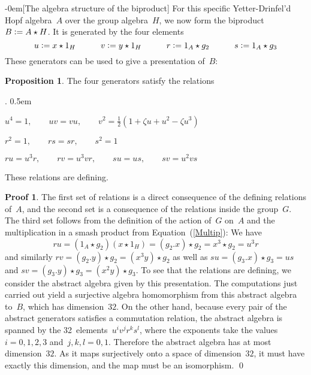 \documentclass{article}
\makeatletter
\renewcommand{\subsection}{\@startsection{subsection}{2}{0em}%
{\baselineskip}{-0em}{\bfseries\normalsize}}
\newcounter{num}
\newcounter{num1}
\newenvironment{proplist}{\begin{list}{\arabic{num1}.}{\usecounter{num1} \listparindent0pt \topsep-2pt  \leftmargin25pt \itemindent0pt \itemsep5pt \partopsep0pt \labelwidth10pt \labelsep0.5em }}{\end{list}}
\numberwithin{equation}{section}
\theoremstyle{definition}
\newtheorem*{prop}{Proposition}
\newtheorem*{pf}{Proof}
\theoremstyle{break}
\newcommand{\deq}{\vcentcolon =}
\newcommand{\1}{{(1)}}
\newcommand{\2}{{(2)}}
\newcommand{\3}{{(3)}}
\newcommand{\A}{1_A}
\newcommand{\HH}{1_H}
\makeatother
\begin{document}
\subsection[The algebra structure of the biproduct]{} \label{AlgBiprod}
\enlargethispage{8pt}
For this specific Yetter-Drinfel'd Hopf algebra~$A$ over the group algebra~$H$, we now form the biproduct~$B \deq A \star H$. It is generated by the four elements
\[u \deq x \star \HH \qquad \quad v \deq y \star \HH \qquad \quad
r \deq \A \star g_2 \qquad \quad s \deq \A \star g_3\]
These generators can be used to give a presentation of~$B$:
\begin{prop}
The four generators satisfy the relations
\begin{proplist}
\item
$\displaystyle
u^4 = 1, \qquad uv = vu, \qquad v^2 = \frac{1}{2}(1 + \zeta u + u^2 - \zeta u^3)$

\item
$\displaystyle
r^2 = 1, \qquad rs = sr, \qquad s^2 = 1$

\item
$\displaystyle
r u = u^3 r, \qquad r v = u^3 v r, \qquad s u = u s, \qquad s v = u^2 v s$
\end{proplist}
These relations are defining.
\end{prop}
\begin{pf}
The first set of relations is a direct consequence of the defining relations of~$A$, and the second set is a consequence of the relations inside the group~$G$. The third set follows from the definition of the action of~$G$ on~$A$ and the multiplication in a smash product from Equation~(\ref{Multip}): We have
\[ru = (\A \star g_2) (x \star \HH) = (g_2.x) \star g_2 = x^3 \star g_2 = u^3 r \]
and similarly $r v = (g_2.y) \star g_2 = (x^3 y) \star g_2$ as well as
$s u = (g_3.x) \star g_3 = u s$ and $s v = (g_3.y) \star g_3 = (x^2 y) \star g_3$.
To see that the relations are defining, we consider the abstract algebra given by this presentation. The computations just carried out yield a surjective algebra homomorphism from this abstract algebra to~$B$, which has dimension~$32$. On the other hand, because every pair of the abstract generators satisfies a commutation relation, the abstract algebra is spanned by the 32~elements~$u^i v^j r^k s^l$, where the exponents take the values $i=0,1,2,3$ and~$j,k,l=0,1$. Therefore the abstract algebra has at most dimension~$32$. As it maps surjectively onto a space of dimension~$32$, it must have exactly this dimension, and the map must be an isomorphism.
\qed
\end{pf}
\end{document}
